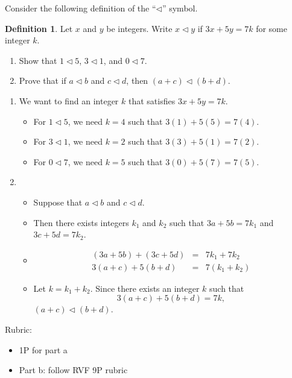 \documentclass{article}
\theoremstyle{definition}
\newtheorem*{definition}{Definition}
\begin{document}
\begin{question}
Consider the following definition of the ``$\triangleleft$'' symbol.
	\begin{definition}
	Let $x$ and $y$ be integers. Write $x\triangleleft y$ if $3x+5y=7k$ for some integer $k$.
	\end{definition}
\begin{enumerate}
\item Show that $1\triangleleft 5$, $3\triangleleft 1$, and $0\triangleleft 7$.
\item Prove that if $a\triangleleft b$ and $c\triangleleft d$, then $(a+c) \triangleleft (b+d)$.
\end{enumerate}
\end{question}
\begin{solution}
\begin{enumerate}
\item We want to find an integer $k$ that satisfies $3x+5y=7k$.
	\begin{itemize}
	\item For $1\triangleleft 5$, we need $k=4$ such that $3(1)+5(5)=7(4)$.
	\item For $3\triangleleft 1$, we need $k=2$ such that $3(3)+5(1)=7(2)$.
	\item For $0\triangleleft 7$, we need $k=5$ such that $3(0)+5(7)=7(5)$.
	\end{itemize}
\item 
	\begin{itemize}
	\item Suppose that $a\triangleleft b$ and $c\triangleleft d$. 
	\item Then there exists integers $k_1$ and $k_2$ such that $3a+5b=7k_1$ and $3c+5d=7k_2$.
	\item \begin{eqnarray*}
	(3a+5b) + (3c+5d) &=& 7k_1 + 7k_2\\
	3(a+c) + 5(b + d) &=& 7(k_1+k_2)
	\end{eqnarray*}
	\item Let $k=k_1+k_2$. Since there exists an integer $k$ such that $$3(a+c) + 5(b + d)=7k,$$ $(a+c) \triangleleft (b+d)$.
	\end{itemize}
\end{enumerate}
{\color{red} Rubric:
\begin{itemize}
\item 1P for part a
\item Part b: follow RVF 9P rubric
\end{itemize}}
\end{solution}
\end{document}
